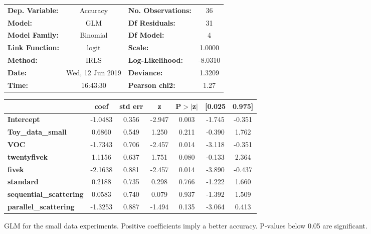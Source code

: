 \begin{figure}[!htb]
	\centering
	\begin{center}
		\begin{tabular}{lclc}
			\toprule
			\textbf{Dep. Variable:}         &     Accuracy     & \textbf{  No. Observations:  } &       36    \\
			\textbf{Model:}                 &       GLM        & \textbf{  Df Residuals:      } &       31    \\
			\textbf{Model Family:}          &     Binomial     & \textbf{  Df Model:          } &        4    \\
			\textbf{Link Function:}         &      logit       & \textbf{  Scale:             } &    1.0000   \\
			\textbf{Method:}                &       IRLS       & \textbf{  Log-Likelihood:    } &   -8.0310   \\
			\textbf{Date:}                  & Wed, 12 Jun 2019 & \textbf{  Deviance:          } &    1.3209   \\
			\textbf{Time:}                  &     16:43:30     & \textbf{  Pearson chi2:      } &     1.27    \\
			\bottomrule
		\end{tabular}
		\begin{tabular}{lcccccc}
			& \textbf{coef} & \textbf{std err} & \textbf{z} & \textbf{P$>$$|$z$|$} & \textbf{[0.025} & \textbf{0.975]}  \\
			\midrule
			\textbf{Intercept}              &      -1.0483  &        0.356     &    -2.947  &         0.003        &       -1.745    &       -0.351     \\
			\textbf{Toy\_data\_small}       &       0.6860  &        0.549     &     1.250  &         0.211        &       -0.390    &        1.762     \\
			\textbf{VOC}                    &      -1.7343  &        0.706     &    -2.457  &         0.014        &       -3.118    &       -0.351     \\
			\textbf{twentyfivek}            &       1.1156  &        0.637     &     1.751  &         0.080        &       -0.133    &        2.364     \\
			\textbf{fivek}                  &      -2.1638  &        0.881     &    -2.457  &         0.014        &       -3.890    &       -0.437     \\
			\textbf{standard}               &       0.2188  &        0.735     &     0.298  &         0.766        &       -1.222    &        1.660     \\
			\textbf{sequential\_scattering} &       0.0583  &        0.740     &     0.079  &         0.937        &       -1.392    &        1.509     \\
			\textbf{parallel\_scattering}   &      -1.3253  &        0.887     &    -1.494  &         0.135        &       -3.064    &        0.413     \\
			\bottomrule
		\end{tabular}
	\end{center}
	\caption{GLM for the small data experiments. Positive coefficients imply a better accuracy. P-values below 0.05 are significant.}
	\label{fig:GLM_small_data}
\end{figure}
